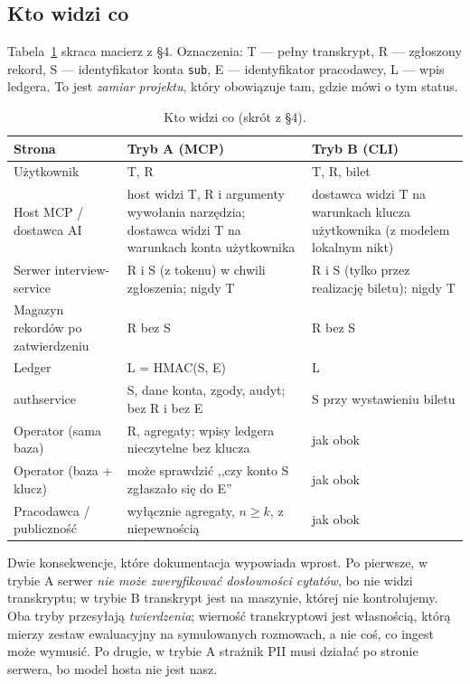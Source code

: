 \subsection{Kto widzi co}

Tabela~\ref{tab:p3-kto} skraca macierz z  §4. Oznaczenia:
T --- pełny transkrypt, R --- zgłoszony rekord, S --- identyfikator konta
\texttt{sub}, E --- identyfikator pracodawcy, L --- wpis ledgera. To jest
\emph{zamiar projektu}, który obowiązuje tam, gdzie mówi o tym status.

\begin{table}[htbp]
\centering
\small
\begin{tabularx}{\linewidth}{@{}>{\raggedright\arraybackslash}p{3.6cm}>{\raggedright\arraybackslash}X>{\raggedright\arraybackslash}X@{}}
\toprule
\textbf{Strona} & \textbf{Tryb A (MCP)} & \textbf{Tryb B (CLI)} \\
\midrule
Użytkownik & T, R & T, R, bilet \\
Host MCP / dostawca AI & host widzi T, R i argumenty wywołania narzędzia; dostawca widzi T na warunkach konta użytkownika & dostawca widzi T na warunkach klucza użytkownika (z modelem lokalnym nikt) \\
Serwer interview-service & R i S (z tokenu) w chwili zgłoszenia; nigdy T & R i S (tylko przez realizację biletu); nigdy T \\
Magazyn rekordów po zatwierdzeniu & R bez S & R bez S \\
Ledger & L = HMAC(S, E) & L \\
authservice & S, dane konta, zgody, audyt; bez R i bez E & S przy wystawieniu biletu \\
Operator (sama baza) & R, agregaty; wpisy ledgera nieczytelne bez klucza & jak obok \\
Operator (baza + klucz) & może sprawdzić ,,czy konto S zgłaszało się do E'' & jak obok \\
Pracodawca / publiczność & wyłącznie agregaty, $n\ge k$, z niepewnością & jak obok \\
\bottomrule
\end{tabularx}
\caption{Kto widzi co (skrót z  §4).}
\label{tab:p3-kto}
\end{table}

Dwie konsekwencje, które dokumentacja wypowiada wprost. Po pierwsze, w
trybie A serwer \emph{nie może zweryfikować dosłowności cytatów}, bo nie widzi
transkryptu; w trybie B transkrypt jest na maszynie, której nie kontrolujemy.
Oba tryby przesyłają \emph{twierdzenia}; wierność transkryptowi jest
własnością, którą mierzy zestaw ewaluacyjny na symulowanych rozmowach, a nie
coś, co ingest może wymusić. Po drugie, w trybie A strażnik PII musi działać
po stronie serwera, bo model hosta nie jest nasz.

